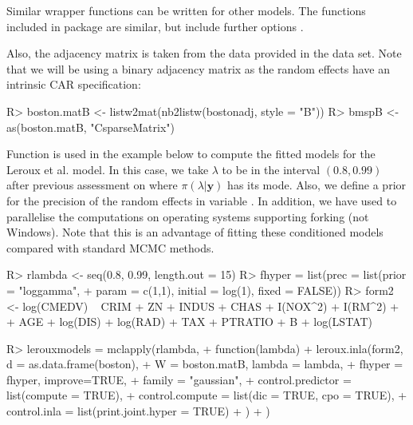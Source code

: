 \documentclass[article]{jss}
\begin{document}
Similar wrapper functions can be written for other models. The functions
included in package  are similar, but include further options
\citep[see,][for details]{Bivandetal:2014}.



Also, the adjacency matrix is taken from the data provided in the 
data set.
Note that we will be using a binary adjacency matrix as the random
effects have an intrinsic CAR specification:
\begin{Schunk}
\begin{Sinput}
R> boston.matB <- listw2mat(nb2listw(bostonadj, style = "B"))
R> bmspB <- as(boston.matB, "CsparseMatrix")
\end{Sinput}
\end{Schunk}

Function  is used in the example below to compute the fitted
models for the Leroux et al. model.  In this case, we take $\lambda$ to be in
the interval $(0.8,0.99)$ after previous assessment on where
$\pi(\lambda|\mathbf{y})$ has its mode. Also, we define a prior for the
precision of the random effects in variable .  In addition, we
have used  to parallelise the computations on operating systems supporting forking (not Windows). Note that this is an
advantage of fitting these conditioned models compared with standard MCMC methods.

\begin{Schunk}
\begin{Sinput}
R> rlambda <- seq(0.8, 0.99, length.out = 15)
R> fhyper = list(prec = list(prior = "loggamma", 
+     param = c(1,1), initial = log(1), fixed = FALSE))
R> form2 <- log(CMEDV) ~ CRIM + ZN + INDUS + CHAS + I(NOX^2) + I(RM^2) + 
+      AGE + log(DIS) + log(RAD) + TAX + PTRATIO + B + log(LSTAT)
\end{Sinput}
\end{Schunk}

\begin{Schunk}
\begin{Sinput}
R> lerouxmodels = mclapply(rlambda,
+          function(lambda) {
+                  leroux.inla(form2, d = as.data.frame(boston), 
+  			W = boston.matB, lambda = lambda,
+                          fhyper = fhyper, improve=TRUE,
+                          family = "gaussian",
+                          control.predictor = list(compute = TRUE),
+                          control.compute = list(dic = TRUE, cpo = TRUE),
+                          control.inla = list(print.joint.hyper = TRUE)
+                  )
+          })
\end{Sinput}
\end{Schunk}
\end{document}
